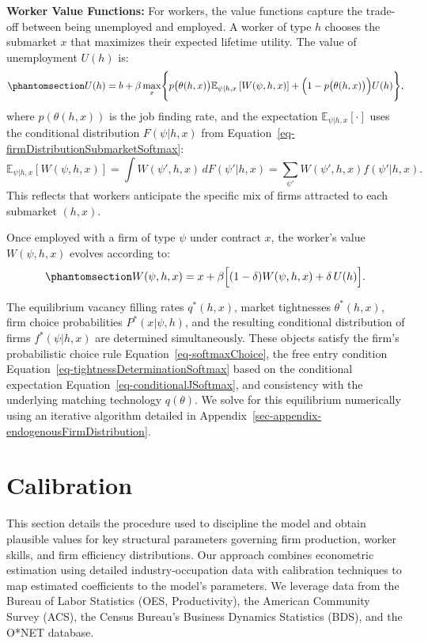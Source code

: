 \documentclass[
  11pt,
  letterpaper,
  DIV=11,
  numbers=noendperiod]{scrartcl}
\theoremstyle{plain}
\theoremstyle{remark}
\begin{document}
\textbf{Worker Value Functions:} For workers, the value functions
capture the trade-off between being unemployed and employed. A worker of
type \(h\) chooses the submarket \(x\) that maximizes their expected
lifetime utility. The value of unemployment \(U(h)\) is:
\begin{equation}\phantomsection\label{eq-unemployedWorkerValue}{ U(h) = b + \beta \max_{x} \Biggl\{ p\bigl(\theta(h,x)\bigr) \mathbb{E}_{\psi|h,x} \left[ W(\psi, h, x) \right] + \Bigl(1 - p\bigl(\theta(h,x)\bigr)\Bigr) U(h)\Biggr\}, }\end{equation}
where \(p(\theta(h, x))\) is the job finding rate, and the expectation
\(\mathbb{E}_{\psi|h,x}[\cdot]\) uses the conditional distribution
\(F(\psi | h, x)\) from
Equation~\ref{eq-firmDistributionSubmarketSoftmax}:
\[ \mathbb{E}_{\psi|h,x} \left[ W(\psi, h, x) \right] = \int W(\psi', h, x) \, dF(\psi' | h, x) = \sum_{\psi'} W(\psi', h, x) f(\psi' | h, x). \]
This reflects that workers anticipate the specific mix of firms
attracted to each submarket \((h, x)\).

Once employed with a firm of type \(\psi\) under contract \(x\), the
worker's value \(W(\psi, h, x)\) evolves according to:
\begin{equation}\phantomsection\label{eq-employedWorkerValue}{ W(\psi, h, x) = x + \beta\Bigl[(1-\delta)W(\psi, h, x) + \delta\,U(h)\Bigr]. }\end{equation}

The equilibrium vacancy filling rates \(q^*(h, x)\), market tightnesses
\(\theta^*(h, x)\), firm choice probabilities \(P^*(x | \psi, h)\), and
the resulting conditional distribution of firms \(f^*(\psi | h, x)\) are
determined simultaneously. These objects satisfy the firm's
probabilistic choice rule Equation~\ref{eq-softmaxChoice}, the free
entry condition Equation~\ref{eq-tightnessDeterminationSoftmax} based on
the conditional expectation Equation~\ref{eq-conditionalJSoftmax}, and
consistency with the underlying matching technology \(q(\theta)\). We
solve for this equilibrium numerically using an iterative algorithm
detailed in Appendix~\ref{sec-appendix-endogenousFirmDistribution}.

\section{Calibration}\label{calibration}

This section details the procedure used to discipline the model and
obtain plausible values for key structural parameters governing firm
production, worker skills, and firm efficiency distributions. Our
approach combines econometric estimation using detailed
industry-occupation data with calibration techniques to map estimated
coefficients to the model's parameters. We leverage data from the Bureau
of Labor Statistics (OES, Productivity), the American Community Survey
(ACS), the Census Bureau's Business Dynamics Statistics (BDS), and the
O*NET database.
\end{document}
